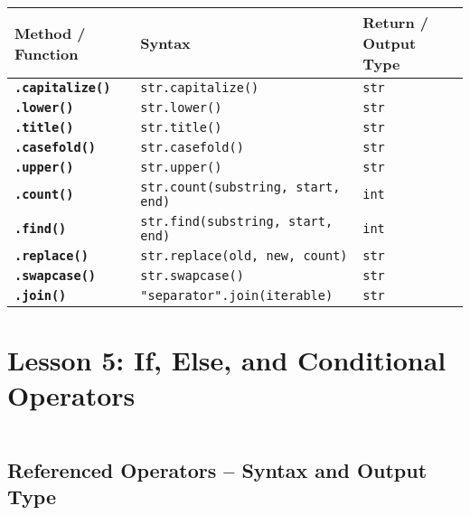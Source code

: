 \documentclass[a4paper,11pt]{article}
\begin{document}
	\begin{tabular}{>{\bfseries}p{3.5cm} p{8cm} p{3cm}}
		\toprule
		Method / Function & Syntax & Return / Output Type \\
		\midrule
		
		\texttt{.capitalize()} & \texttt{str.capitalize()} & \texttt{str} \\
		
		\texttt{.lower()} & \texttt{str.lower()} & \texttt{str} \\
		
		\texttt{.title()} & \texttt{str.title()} & \texttt{str} \\
		
		\texttt{.casefold()} & \texttt{str.casefold()} & \texttt{str} \\
		
		\texttt{.upper()} & \texttt{str.upper()} & \texttt{str} \\
		
		\texttt{.count()} & \texttt{str.count(substring, start, end)} & \texttt{int} \\
		
		\texttt{.find()} & \texttt{str.find(substring, start, end)} & \texttt{int} \\
		
		\texttt{.replace()} & \texttt{str.replace(old, new, count)} & \texttt{str} \\
		
		\texttt{.swapcase()} & \texttt{str.swapcase()} & \texttt{str} \\
		
		\texttt{.join()} & \texttt{"separator".join(iterable)} & \texttt{str} \\
		
		\bottomrule
	\end{tabular}
	
	
	\section{Lesson 5: If, Else, and Conditional Operators}
	\inputminted{python}{Python_Files/if_else_guid.py}
	
	\vspace{1em}
	\subsection*{Referenced Operators – Syntax and Output Type}
	
\end{document}
